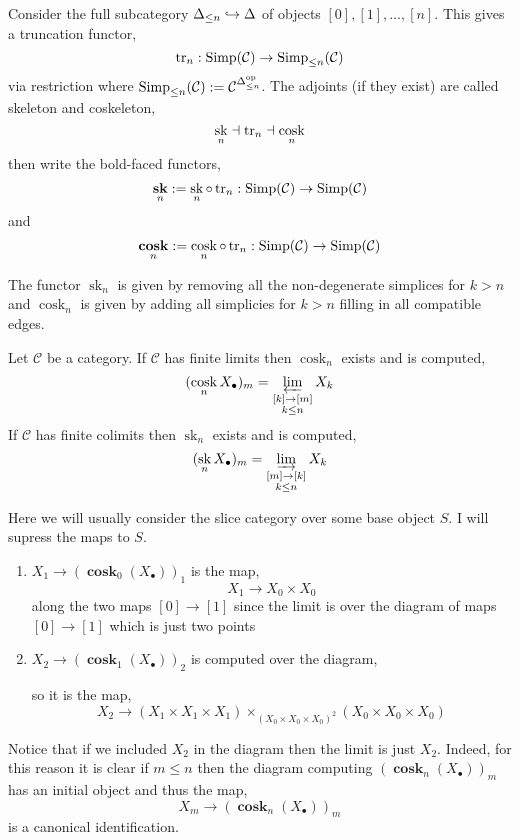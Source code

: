 \documentclass[12pt]{article}
\newcommand{\cC}{\mathcal{C}}
\newcommand{\Simp}{\mathrm{Simp}}
\DeclareMathOperator{\sk}{\mathrm{sk}}
\DeclareMathOperator{\cosk}{\mathrm{cosk}}
\DeclareMathOperator{\bfsk}{\mathbf{sk}}
\DeclareMathOperator{\bfcosk}{\mathbf{cosk}}
\begin{document}
\begin{defn}
Consider the full subcategory $\Delta_{\le n} \hookrightarrow \Delta$ of objects $[0], [1], \dots, [n]$. This gives a truncation functor,
\[ \tr_n : \Simp(\cC) \to \Simp_{\le n}(\cC) \]
via restriction where $\Simp_{\le n}(\cC) := \cC^{\Delta_{\le n}^\op}$. The adjoints (if they exist) are called skeleton and coskeleton,
\[ \sk_n \dashv \tr_n \dashv \cosk_n \]
then write the bold-faced functors,
\[ \bfsk_n := \sk_n \circ \tr_n : \Simp(\cC) \to \Simp(\cC) \]
and
\[ \bfcosk_n := \cosk_n \circ \tr_n : \Simp(\cC) \to \Simp(\cC) \]
\end{defn}

\begin{rmk}
The functor $\sk_n$ is given by removing all the non-degenerate simplices for $k > n$ and $\cosk_n$ is given by adding all simplicies for $k > n$ filling in all compatible edges.
\end{rmk}

\begin{prop}
Let $\cC$ be a category. If $\cC$ has finite limits then $\cosk_n$ exists and is computed,
\[ (\cosk_n X_\bullet)_m = \ilim_{\substack{[k] \to [m] \\ k \le n}} X_k \]
If $\cC$ has finite colimits then $\sk_n$ exists and is computed,
\[ (\sk_n X_\bullet)_m = \dlim_{\substack{[m] \to [k] \\ k \le n}} X_k \]
\end{prop}

\begin{example}
Here we will usually consider the slice category over some base object $S$. I will supress the maps to $S$. 
\begin{enumerate}
\item $X_1 \to (\bfcosk_0(X_\bullet))_{1}$ is the map,
\[ X_1 \to X_0 \times X_0 \]
along the two maps $[0] \to [1]$ since the limit is over the diagram of maps $[0] \to [1]$ which is just two points
\item $X_2 \to (\bfcosk_1(X_\bullet))_{2}$ is computed over the diagram,
\begin{center}
\end{center}
so it is the map,
\[ X_2 \to (X_1 \times X_1 \times X_1) \times_{(X_0 \times X_0 \times X_0)^2} (X_0 \times X_0 \times X_0)  \]
\end{enumerate}
Notice that if we included $X_2$ in the diagram then the limit is just $X_2$. Indeed, for this reason it is clear if $m \le n$ then the diagram computing $(\bfcosk_n(X_\bullet))_m$ has an initial object and thus the map,
\[ X_m \to (\bfcosk_n(X_\bullet))_m \]
is a canonical identification. 
\end{example}
\end{document}

